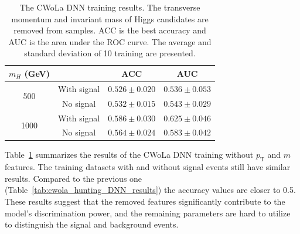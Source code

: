\documentclass[12pt]{article}
\begin{document}
        \begin{table}[htpb]
            \centering
            \caption{The CWoLa DNN training results. The transverse momentum and invariant mass of Higgs candidates are removed from samples. ACC is the best accuracy and AUC is the area under the ROC curve. The average and standard deviation of 10 training are presented.}
            \label{tab:cwola_hunting_DNN_results_wo_pt_m}
            \begin{tabular}{c|c|cc}
                $m_H$ (GeV)           &             & ACC               & AUC               \\ \hline
                \multirow{2}{*}{500}  & With signal & $0.526 \pm 0.020$ & $0.536 \pm 0.053$ \\
                                      & No signal   & $0.532 \pm 0.015$ & $0.543 \pm 0.029$ \\ \hline
                \multirow{2}{*}{1000} & With signal & $0.586 \pm 0.030$ & $0.625 \pm 0.046$ \\
                                      & No signal   & $0.564 \pm 0.024$ & $0.583 \pm 0.042$
            \end{tabular}
        \end{table}

         Table~\ref{tab:cwola_hunting_DNN_results_wo_pt_m} summarizes the results of the CWoLa DNN training without $p_{\text{T}}$ and $m$ features. The training datasets with and without signal events still have similar results. Compared to the previous one (Table~\ref{tab:cwola_hunting_DNN_results}) the accuracy values are closer to 0.5. These results suggest that the removed features significantly contribute to the model's discrimination power, and the remaining parameters are hard to utilize to distinguish the signal and background events.
\end{document}
